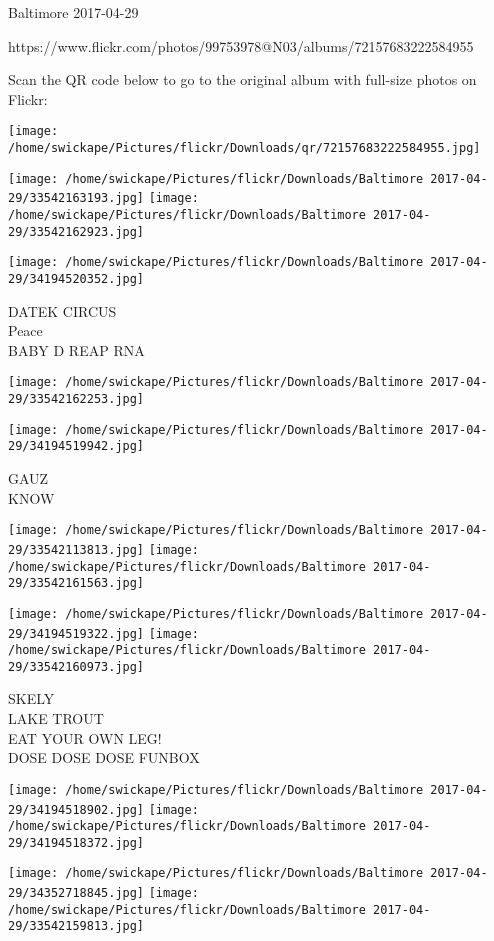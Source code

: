 \documentclass[10pt,letterpaper]{article}
\begin{document}
Baltimore 2017-04-29

https://www.flickr.com/photos/99753978@N03/albums/72157683222584955

Scan the QR code below to go to the original album with full-size photos on Flickr:

\texttt{[image: /home/swickape/Pictures/flickr/Downloads/qr/72157683222584955.jpg]}
\pagebreak

\texttt{[image: /home/swickape/Pictures/flickr/Downloads/Baltimore 2017-04-29/33542163193.jpg]}
\texttt{[image: /home/swickape/Pictures/flickr/Downloads/Baltimore 2017-04-29/33542162923.jpg]}

\texttt{[image: /home/swickape/Pictures/flickr/Downloads/Baltimore 2017-04-29/34194520352.jpg]}

DATEK CIRCUS\\
Peace\\
BABY D REAP RNA
\pagebreak

\texttt{[image: /home/swickape/Pictures/flickr/Downloads/Baltimore 2017-04-29/33542162253.jpg]}

\vspace{0.25in}
\texttt{[image: /home/swickape/Pictures/flickr/Downloads/Baltimore 2017-04-29/34194519942.jpg]}

GAUZ\\
KNOW
\pagebreak

\texttt{[image: /home/swickape/Pictures/flickr/Downloads/Baltimore 2017-04-29/33542113813.jpg]}
\texttt{[image: /home/swickape/Pictures/flickr/Downloads/Baltimore 2017-04-29/33542161563.jpg]}

\texttt{[image: /home/swickape/Pictures/flickr/Downloads/Baltimore 2017-04-29/34194519322.jpg]}
\texttt{[image: /home/swickape/Pictures/flickr/Downloads/Baltimore 2017-04-29/33542160973.jpg]}

SKELY\\
LAKE TROUT\\
EAT YOUR OWN LEG!\\
DOSE DOSE DOSE FUNBOX
\pagebreak

\texttt{[image: /home/swickape/Pictures/flickr/Downloads/Baltimore 2017-04-29/34194518902.jpg]}
\texttt{[image: /home/swickape/Pictures/flickr/Downloads/Baltimore 2017-04-29/34194518372.jpg]}

\texttt{[image: /home/swickape/Pictures/flickr/Downloads/Baltimore 2017-04-29/34352718845.jpg]}
\texttt{[image: /home/swickape/Pictures/flickr/Downloads/Baltimore 2017-04-29/33542159813.jpg]}
\end{document}
